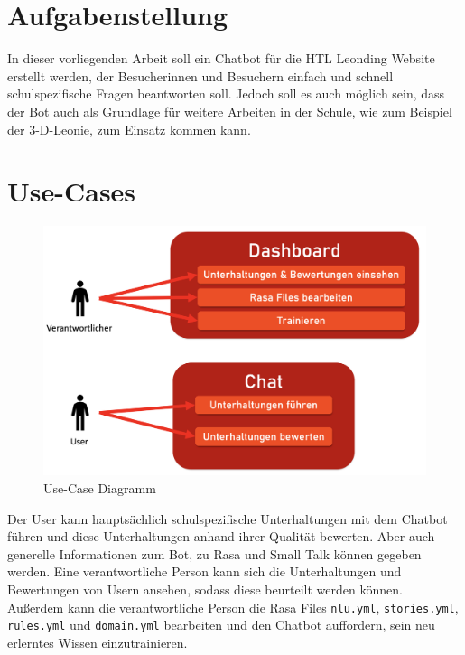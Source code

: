 \section{Aufgabenstellung}
In dieser vorliegenden Arbeit soll ein Chatbot für die HTL Leonding Website erstellt werden, der Besucherinnen und Besuchern einfach und schnell schulspezifische Fragen beantworten soll.
Jedoch soll es auch möglich sein, dass der Bot auch als Grundlage für weitere Arbeiten in der Schule, wie zum Beispiel der 3-D-Leonie, zum Einsatz kommen kann.

\section{Use-Cases}

\begin{figure}[hbt!]
    \centering
    \includegraphics[scale=0.5]{pics/usecase}
    \caption{Use-Case Diagramm}
    \label{fig:impl:usecase}
\end{figure}

Der User kann hauptsächlich schulspezifische Unterhaltungen mit dem Chatbot führen und diese Unterhaltungen anhand ihrer Qualität bewerten.
Aber auch generelle Informationen zum Bot, zu Rasa und Small Talk können gegeben werden.
Eine verantwortliche Person kann sich die Unterhaltungen und Bewertungen von Usern ansehen, sodass diese beurteilt werden können.
Außerdem kann die verantwortliche Person die Rasa Files \texttt{nlu.yml}, \texttt{stories.yml}, \texttt{rules.yml} und \texttt{domain.yml} bearbeiten und den Chatbot auffordern, sein neu erlerntes Wissen einzutrainieren.
